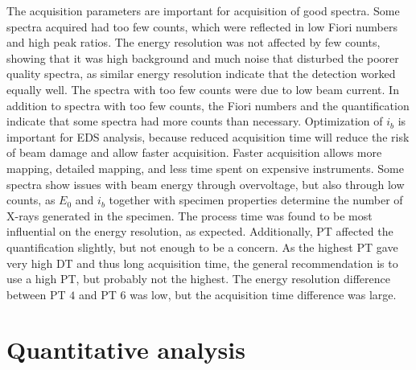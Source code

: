 The acquisition parameters are important for acquisition of good spectra.
Some spectra acquired had too few counts, which were reflected in low Fiori numbers and high peak ratios.
The energy resolution was not affected by few counts, showing that it was high background and much noise that disturbed the poorer quality spectra, as similar energy resolution indicate that the detection worked equally well.
The spectra with too few counts were due to low beam current.
In addition to spectra with too few counts, the Fiori numbers and the quantification indicate that some spectra had more counts than necessary.
Optimization of $i_b$ is important for EDS analysis, because reduced acquisition time will reduce the risk of beam damage and allow faster acquisition.
Faster acquisition allows more mapping, detailed mapping, and less time spent on expensive instruments.
Some spectra show issues with beam energy through overvoltage, but also through low counts, as  $E_0$ and $i_b$ together with specimen properties determine the number of X-rays generated in the specimen.
The process time was found to be most influential on the energy resolution, as expected.
Additionally, PT affected the quantification slightly, but not enough to be a concern.
As the highest PT gave very high DT and thus long acquisition time, the general recommendation is to use a high PT, but probably not the highest.
The energy resolution difference between PT $4$ and PT $6$ was low, but the acquisition time difference was large.


\clearpage




























\section{Quantitative analysis}
\label{discussion:quantitative}



